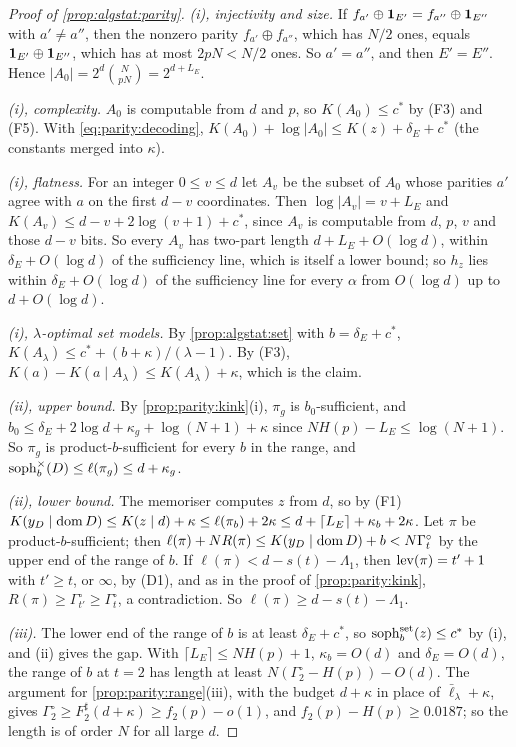 \begin{proof}[Proof of \cref{prop:algstat:parity}]
\emph{(i), injectivity and size.} If $f_{a'}\oplus\mathbf{1}_{E'}=f_{a''}\oplus\mathbf{1}_{E''}$ with $a'\ne a''$, then the nonzero parity $f_{a'}\oplus f_{a''}$, which has $N/2$ ones, equals $\mathbf{1}_{E'}\oplus\mathbf{1}_{E''}$, which has at most $2pN<N/2$ ones. So $a'=a''$, and then $E'=E''$. Hence $|A_0|=2^d\binom N{pN}=2^{d+L_E}$.

\emph{(i), complexity.} $A_0$ is computable from $d$ and $p$, so $K(A_0)\le c^*$ by (F3) and (F5). With \eqref{eq:parity:decoding}, $K(A_0)+\log|A_0|\le K(z)+\delta_E+c^*$ (the constants merged into $\kappa$).

\emph{(i), flatness.} For an integer $0\le v\le d$ let $A_v$ be the subset of $A_0$ whose parities $a'$ agree with $a$ on the first $d-v$ coordinates. Then $\log|A_v|=v+L_E$ and $K(A_v)\le d-v+2\log(v+1)+c^*$, since $A_v$ is computable from $d$, $p$, $v$ and those $d-v$ bits. So every $A_v$ has two-part length $d+L_E+O(\log d)$, within $\delta_E+O(\log d)$ of the sufficiency line, which is itself a lower bound; so $h_z$ lies within $\delta_E+O(\log d)$ of the sufficiency line for every $\alpha$ from $O(\log d)$ up to $d+O(\log d)$.

\emph{(i), $\lambda$-optimal set models.} By \cref{prop:algstat:set} with $b=\delta_E+c^*$, $K(A_\lambda)\le c^*+(b+\kappa)/(\lambda-1)$. By (F3), $K(a)-K(a\mid A_\lambda)\le K(A_\lambda)+\kappa$, which is the claim.

\emph{(ii), upper bound.} By \cref{prop:parity:kink}(i), $\pi_g$ is $b_0$-sufficient, and $b_0\le\delta_E+2\log d+\kappa_g+\log(N+1)+\kappa$ since $NH(p)-L_E\le\log(N+1)$. So $\pi_g$ is product-$b$-sufficient for every $b$ in the range, and $\operatorname{soph}^{\times}_b(D)\le\ell(\pi_g)\le d+\kappa_g$.

\emph{(ii), lower bound.} The memoriser computes $z$ from $d$, so by (F1) $K(y_D\mid\operatorname{dom} D)\le K(z\mid d)+\kappa\le\ell(\pi_b)+2\kappa\le d+\lceil L_E\rceil+\kappa_b+2\kappa$. Let $\pi$ be product-$b$-sufficient; then $\ell(\pi)+NR(\pi)\le K(y_D\mid\operatorname{dom} D)+b<N\Gamma^\circ_t$ by the upper end of the range of $b$. If $\ell(\pi)<d-s(t)-\Lambda_1$, then $\operatorname{lev}(\pi)=t'+1$ with $t'\ge t$, or $\infty$, by (D1), and as in the proof of \cref{prop:parity:kink}, $R(\pi)\ge\Gamma^\circ_{t'}\ge\Gamma^\circ_t$, a contradiction. So $\ell(\pi)\ge d-s(t)-\Lambda_1$.

\emph{(iii).} The lower end of the range of $b$ is at least $\delta_E+c^*$, so $\operatorname{soph}^{\mathrm{set}}_b(z)\le c^*$ by (i), and (ii) gives the gap. With $\lceil L_E\rceil\le NH(p)+1$, $\kappa_b=O(d)$ and $\delta_E=O(d)$, the range of $b$ at $t=2$ has length at least $N(\Gamma^\circ_2-H(p))-O(d)$. The argument for \cref{prop:parity:range}(iii), with the budget $d+\kappa$ in place of $\bar\ell_\lambda+\kappa$, gives $\Gamma^\circ_2\ge F^\sharp_2(d+\kappa)\ge f_2(p)-o(1)$, and $f_2(p)-H(p)\ge0.0187$; so the length is of order $N$ for all large $d$.
\end{proof}

